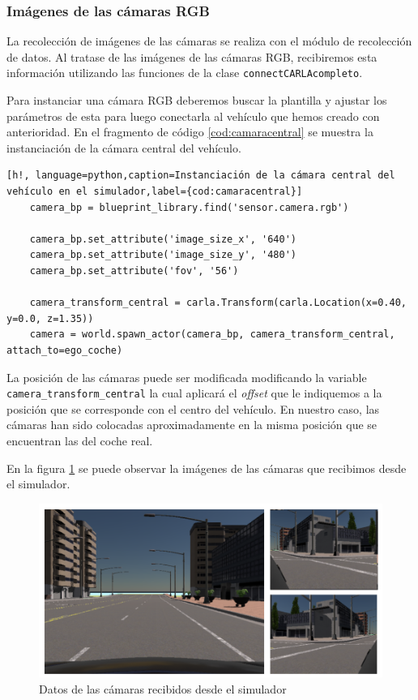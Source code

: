 \subsubsection{Imágenes de las cámaras RGB}

La recolección de imágenes de las cámaras se realiza con el módulo de recolección de datos. Al tratase de las imágenes de las cámaras RGB, recibiremos esta información utilizando las funciones de la clase \texttt{connectCARLAcompleto}.

Para instanciar una cámara RGB deberemos buscar la plantilla y ajustar los parámetros de esta para luego conectarla al vehículo que hemos creado con anterioridad. En el fragmento de código \ref{cod:camaracentral} se muestra la instanciación de la cámara central del vehículo.

\begin{lstlisting}[h!, language=python,caption=Instanciación de la cámara central del vehículo en el simulador,label={cod:camaracentral}]
    camera_bp = blueprint_library.find('sensor.camera.rgb')

    camera_bp.set_attribute('image_size_x', '640')
    camera_bp.set_attribute('image_size_y', '480')
    camera_bp.set_attribute('fov', '56')

    camera_transform_central = carla.Transform(carla.Location(x=0.40, y=0.0, z=1.35))
    camera = world.spawn_actor(camera_bp, camera_transform_central, attach_to=ego_coche)
\end{lstlisting}

La posición de las cámaras puede ser modificada modificando la variable \texttt{camera\_transform\_central} la cual aplicará el \textit{offset} que le indiquemos a la posición que se corresponde con el centro del vehículo. En nuestro caso, las cámaras han sido colocadas aproximadamente en la misma posición que se encuentran las del coche real.

En la figura \ref{fig:imgscams} se puede observar la imágenes de las cámaras que recibimos desde el simulador.
\begin{figure}[h!]
    \centering
    \includegraphics[width=0.8\linewidth]{img/Imagenes camaras.png}
    \caption{Datos de las cámaras recibidos desde el simulador}
    \label{fig:imgscams}    
\end{figure}



